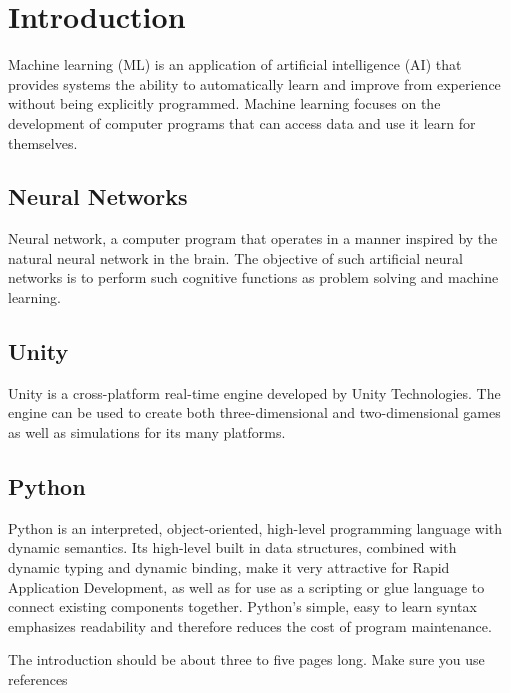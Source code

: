 
\chapter{Introduction}
Machine learning (ML) is an application of artificial intelligence (AI) that provides systems the ability to automatically learn and improve from experience without being explicitly programmed. Machine learning focuses on the development of computer programs that can access data and use it learn for themselves.
\section{Neural Networks}
Neural network, a computer program that operates in a manner inspired by the natural neural network in the brain. The objective of such artificial neural networks is to perform such cognitive functions as problem solving and machine learning.
\section{Unity}
Unity is a cross-platform real-time engine developed by Unity Technologies. The engine can be used to create both three-dimensional and two-dimensional games as well as simulations for its many platforms.
\section{Python}
Python is an interpreted, object-oriented, high-level programming language with dynamic semantics. Its high-level built in data structures, combined with dynamic typing and dynamic binding, make it very attractive for Rapid Application Development, as well as for use as a scripting or glue language to connect existing components together. Python's simple, easy to learn syntax emphasizes readability and therefore reduces the cost of program maintenance. 



The introduction should be about three to five pages long.
Make sure you use references~\cite{einstein}